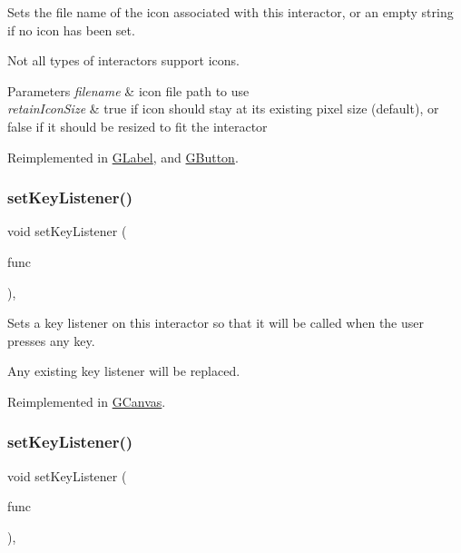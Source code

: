 Sets the file name of the icon associated with this interactor, or an empty string if no icon has been set. 

Not all types of interactors support icons. 
\begin{DoxyParams}{Parameters}
{\em filename} & icon file path to use \\
\hline
{\em retain\+Icon\+Size} & true if icon should stay at its existing pixel size (default), or false if it should be resized to fit the interactor \\
\hline
\end{DoxyParams}


Reimplemented in \mbox{\hyperlink{classGLabel_abbefcb1f611af273755c7e1cca921497}{G\+Label}}, and \mbox{\hyperlink{classGButton_abbefcb1f611af273755c7e1cca921497}{G\+Button}}.

\mbox{\label{classGInteractor_aeb8324d3287fa1fbe093f4d6230cf0a6}} 
\subsubsection{\texorpdfstring{set\+Key\+Listener()}{setKeyListener()}\hspace{0.1cm}{\footnotesize\ttfamily [1/2]}}
{\footnotesize\ttfamily void set\+Key\+Listener (\begin{DoxyParamCaption}\item[{G\+Event\+Listener}]{func }\end{DoxyParamCaption})\hspace{0.3cm}{\ttfamily [virtual]}, {\ttfamily [inherited]}}



Sets a key listener on this interactor so that it will be called when the user presses any key. 

Any existing key listener will be replaced. 

Reimplemented in \mbox{\hyperlink{classGCanvas_a53809ec015da5bf9fad5e7a11b218993}{G\+Canvas}}.

\mbox{\label{classGInteractor_ae48ecea73606c7bd9423e1c7cc589cc9}} 
\subsubsection{\texorpdfstring{set\+Key\+Listener()}{setKeyListener()}\hspace{0.1cm}{\footnotesize\ttfamily [2/2]}}
{\footnotesize\ttfamily void set\+Key\+Listener (\begin{DoxyParamCaption}\item[{G\+Event\+Listener\+Void}]{func }\end{DoxyParamCaption})\hspace{0.3cm}{\ttfamily [virtual]}, {\ttfamily [inherited]}}



